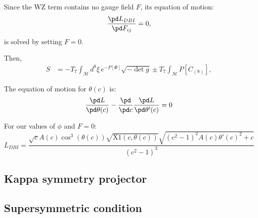 Since the WZ term contains no gauge field $F$, its equation of motion:
\begin{equation}
 \dfrac{\pd L_{DBI}}{\pd F_{ij}} = 0,
\end{equation}
is solved by setting $F=0$. 

Then,
\begin{align}
 S & = -T_7 \int_\mathcal{M} d^8\xi \, e^{-P[\Phi] } \sqrt{-\det g} \pm
 T_7\int _\mathcal{M} P[C_{(8)}],
\end{align}

The equation of motion for $\theta(c)$ is:
\begin{equation}
\dfrac{\pd L}{\pd \theta(c)} - \dfrac{\pd}{\pd c} \dfrac{\pd L}{\pd \theta'(c)} = 0
\end{equation}

For our values of $\phi$ and $F=0$:
\begin{equation}
 L_{DBI} = \frac{\sqrt{c} A(c) \cos ^3(\theta (c)) \sqrt{\text{X1}(c,\theta (c))} \sqrt{\left(c^2-1\right)^2 A(c) \theta '(c)^2+c}}{\left(c^2-1\right)^3}
\end{equation}





\subsection{Kappa symmetry projector}

\subsection{Supersymmetric condition}

